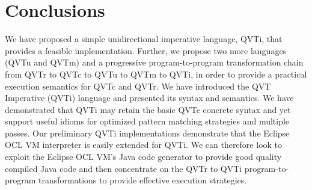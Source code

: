 %
\section{Conclusions}\label{sec:concandfuture}

We have proposed a simple unidirectional imperative language, QVTi, that provides a feasible implementation. Further, we propose two more languages (QVTu and QVTm) and a progressive program-to-program transformation chain from QVTr to QVTc to QVTu to QVTm to QVTi, in order to provide a practical execution semantics for QVTc and QVTr. We have introduced the QVT Imperative (QVTi) language and presented its syntax and semantics. We have demonstrated that QVTi may retain the basic QVTc concrete syntax and yet support useful idioms for optimized pattern matching strategies and multiple passes. Our preliminary QVTi implementations demonstrate that the Eclipse OCL VM interpreter is easily extended for QVTi. We can therefore look to exploit the Eclipse OCL VM's Java code generator to provide good quality compiled Java code and then concentrate on the QVTr to QVTi program-to-program transformations to provide effective execution strategies.

